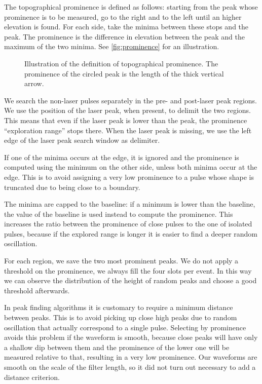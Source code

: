 The topographical prominence is defined as follows: starting from the peak
whose prominence is to be measured, go to the right and to the left until an
higher elevation is found. For each side, take the minima between these stops
and the peak. The prominence is the difference in elevation between the peak
and the maximum of the two minima. See \autoref{fig:prominence} for an
illustration.

\begin{figure}
    
    
    \caption{\label{fig:prominence} Illustration of the definition of
    topographical prominence. The prominence of the circled peak is the length
    of the thick vertical arrow.}
    
\end{figure}

We search the non-laser pulses separately in the pre- and post-laser peak
regions. We use the position of the laser peak, when present, to delimit the
two regions. This means that even if the laser peak is lower than the peak, the
prominence ``exploration range'' stops there. When the laser peak is missing,
we use the left edge of the laser peak search window as delimiter.

If one of the minima occurs at the edge, it is ignored and the prominence is
computed using the minimum on the other side, unless both minima occur at the
edge. This is to avoid assigning a very low prominence to a pulse whose shape
is truncated due to being close to a boundary.

The minima are capped to the baseline: if a minimum is lower than the baseline,
the value of the baseline is used instead to compute the prominence. This
increases the ratio between the prominence of close pulses to the one of
isolated pulses, because if the explored range is longer it is easier to find a
deeper random oscillation.

For each region, we save the two most prominent peaks. We do not apply a
threshold on the prominence, we always fill the four slots per event. In this
way we can observe the distribution of the height of random peaks and choose a
good threshold afterwards.


In peak finding algorithms it is customary to require a minimum distance
between peaks. This is to avoid picking up close high peaks due to random
oscillation that actually correspond to a single pulse. Selecting by prominence
avoids this problem if the waveform is smooth, because close peaks will have
only a shallow dip between them and the prominence of the lower one will be
measured relative to that, resulting in a very low prominence. Our waveforms
are smooth on the scale of the filter length, so it did not turn out necessary
to add a distance criterion.

